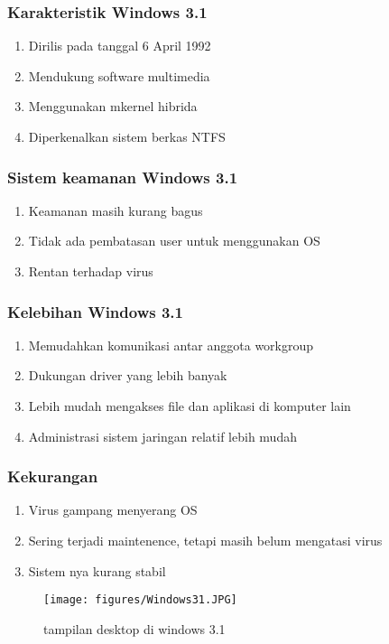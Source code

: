 	\subsubsection{Karakteristik Windows 3.1}
\begin{enumerate}
		\item Dirilis pada tanggal 6 April 1992
		\item Mendukung software multimedia
		\item Menggunakan mkernel hibrida
		\item Diperkenalkan sistem berkas NTFS
\end{enumerate}
	\subsubsection{Sistem keamanan Windows 3.1}
\begin{enumerate}
		\item Keamanan masih kurang bagus
		\item Tidak ada pembatasan user untuk menggunakan OS
		\item Rentan terhadap virus
\end{enumerate}
	\subsubsection{Kelebihan Windows 3.1}
\begin{enumerate}
		\item Memudahkan komunikasi antar anggota workgroup
		\item Dukungan driver yang lebih banyak
		\item Lebih mudah mengakses file dan aplikasi di komputer lain
		\item Administrasi sistem jaringan relatif lebih mudah
\end{enumerate}
	\subsubsection{Kekurangan}
\begin{enumerate}
		\item Virus gampang menyerang OS
		\item Sering terjadi maintenence, tetapi masih belum mengatasi virus
		\item Sistem nya kurang stabil
\end{enumerate}
\begin{figure}[ht]
\centerline{\texttt{[image: figures/Windows31.JPG]}}
\caption{tampilan desktop di windows 3.1}
\label{Windows31}
\end{figure}

